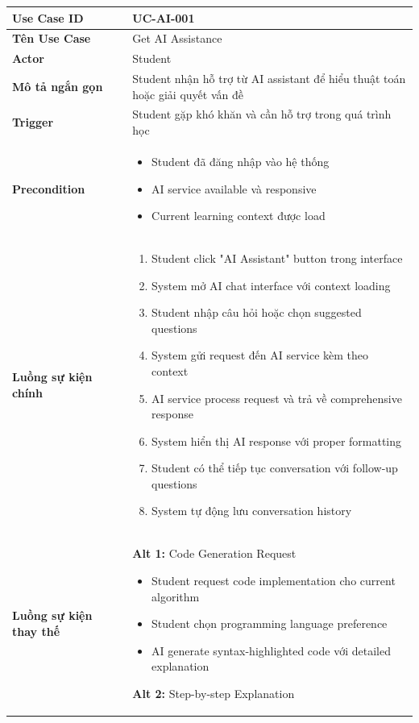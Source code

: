 \begin{longtable}{| p{3cm} | p{10cm} |}
\hline
\textbf{Use Case ID} & UC-AI-001 \\ \hline
\textbf{Tên Use Case} & Get AI Assistance \\ \hline
\textbf{Actor} & Student \\ \hline
\textbf{Mô tả ngắn gọn} & Student nhận hỗ trợ từ AI assistant để hiểu thuật toán hoặc giải quyết vấn đề \\ \hline
\textbf{Trigger} & Student gặp khó khăn và cần hỗ trợ trong quá trình học \\ \hline
\textbf{Precondition} & 
\begin{itemize}
    \item Student đã đăng nhập vào hệ thống
    \item AI service available và responsive
    \item Current learning context được load
\end{itemize} \\ \hline
\textbf{Luồng sự kiện chính} & 
\begin{enumerate}
    \item Student click "AI Assistant" button trong interface
    \item System mở AI chat interface với context loading
    \item Student nhập câu hỏi hoặc chọn suggested questions
    \item System gửi request đến AI service kèm theo context
    \item AI service process request và trả về comprehensive response
    \item System hiển thị AI response với proper formatting
    \item Student có thể tiếp tục conversation với follow-up questions
    \item System tự động lưu conversation history
\end{enumerate} \\ \hline
\textbf{Luồng sự kiện thay thế} & 
\textbf{Alt 1:} Code Generation Request
\begin{itemize}
    \item Student request code implementation cho current algorithm
    \item Student chọn programming language preference
    \item AI generate syntax-highlighted code với detailed explanation
\end{itemize}
\textbf{Alt 2:} Step-by-step Explanation

\end{longtable}
